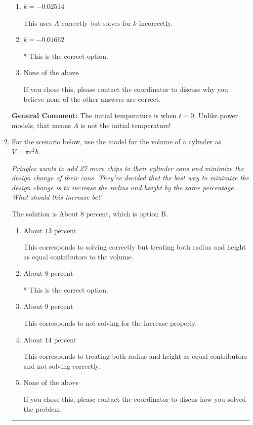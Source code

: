 \documentclass{extbook}[14pt]
\newcommand{\litem}[1]{\item #1

\rule{\textwidth}{0.4pt}}
\begin{document}
\begin{enumerate}
{\begin{enumerate}[label=\Alph*.]
This uses $A$ as the initial temperature and solves for $k$ correctly.
\item \( k = -0.02514 \)

This uses $A$ correctly but solves for $k$ incorrectly.
\item \( k = -0.01662 \)

* This is the correct option.
\item \( \text{None of the above} \)

If you chose this, please contact the coordinator to discuss why you believe none of the other answers are correct.
\end{enumerate}

\textbf{General Comment:} The initial temperature is when $t = 0$. Unlike power models, that means $A$ is not the initial temperature!
}
\litem{
For the scenario below, use the model for the volume of a cylinder as $V = \pi r^2 h$.

\begin{center}
    \textit{ Pringles wants to add 27 \text{percent} more chips to their cylinder cans and minimize the design change of their cans. They've decided that the best way to minimize the design change is to increase the radius and height by the same percentage. What should this increase be? }
\end{center}
The solution is \( \text{About } 8 \text{ percent} \), which is option B.\begin{enumerate}[label=\Alph*.]
\item \( \text{About } 13 \text{ percent} \)

This corresponds to solving correctly but treating both radius and height as equal contributors to the volume.
\item \( \text{About } 8 \text{ percent} \)

* This is the correct option.
\item \( \text{About } 9 \text{ percent} \)

This corresponds to not solving for the increase properly.
\item \( \text{About } 14 \text{ percent} \)

This corresponds to treating both radius and height as equal contributors and not solving correctly.
\item \( \text{None of the above} \)

If you chose this, please contact the coordinator to discus how you solved the problem.
\end{enumerate}

}
\end{enumerate}
\end{document}
